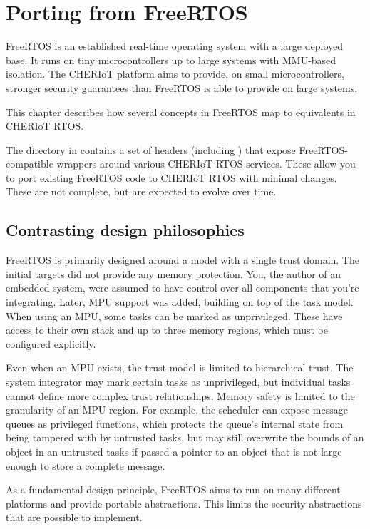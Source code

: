 \chapter[label=from_freertos]{Porting from FreeRTOS}

FreeRTOS is an established real-time operating system with a large deployed base.
It runs on tiny microcontrollers up to large systems with MMU-based isolation.
The CHERIoT platform aims to provide, on small microcontrollers, stronger security guarantees than FreeRTOS is able to provide on large systems.

This chapter describes how several concepts in FreeRTOS map to equivalents in CHERIoT RTOS.

The  directory in  contains a set of headers (including ) that expose FreeRTOS-compatible wrappers around various CHERIoT RTOS services.
These allow you to port existing FreeRTOS code to CHERIoT RTOS with minimal changes.
These are not complete, but are expected to evolve over time.

\section{Contrasting design philosophies}

FreeRTOS is primarily designed around a model with a single trust domain.
The initial targets did not provide any memory protection.
You, the author of an embedded system, were assumed to have control over all components that you're integrating.
Later, MPU support was added, building on top of the task model.
When using an MPU, some tasks can be marked as unprivileged.
These have access to their own stack and up to three memory regions, which must be configured explicitly.

Even when an MPU exists, the trust model is limited to hierarchical trust.
The system integrator may mark certain tasks as unprivileged, but individual tasks cannot define more complex trust relationships.
Memory safety is limited to the granularity of an MPU region.
For example, the scheduler can expose message queues as privileged functions, which protects the queue's internal state from being tampered with by untrusted tasks, but may still overwrite the bounds of an object in an untrusted tasks if passed a pointer to an object that is not large enough to store a complete message.

As a fundamental design principle, FreeRTOS aims to run on many different platforms and provide portable abstractions.
This limits the security abstractions that are possible to implement.

